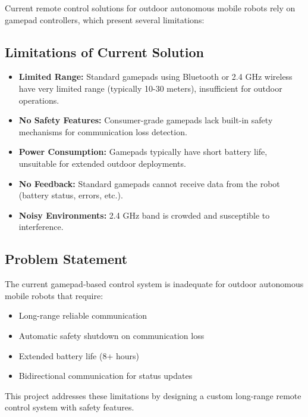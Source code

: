 Current remote control solutions for outdoor autonomous mobile robots rely on gamepad controllers, which present several limitations:

\subsection*{Limitations of Current Solution}
\begin{itemize}
    \item \textbf{Limited Range:} Standard gamepads using Bluetooth or 2.4 GHz wireless have very limited range (typically 10-30 meters), insufficient for outdoor operations.
    
    \item \textbf{No Safety Features:} Consumer-grade gamepads lack built-in safety mechanisms for communication loss detection.
    
    \item \textbf{Power Consumption:} Gamepads typically have short battery life, unsuitable for extended outdoor deployments.
    
    \item \textbf{No Feedback:} Standard gamepads cannot receive data from the robot (battery status, errors, etc.).
    
    \item \textbf{Noisy Environments:} 2.4 GHz band is crowded and susceptible to interference.
\end{itemize}

\subsection*{Problem Statement}
The current gamepad-based control system is inadequate for outdoor autonomous mobile robots that require:
\begin{itemize}
    \item Long-range reliable communication
    \item Automatic safety shutdown on communication loss
    \item Extended battery life (8+ hours)
    \item Bidirectional communication for status updates
\end{itemize}

This project addresses these limitations by designing a custom long-range remote control system with safety features.
